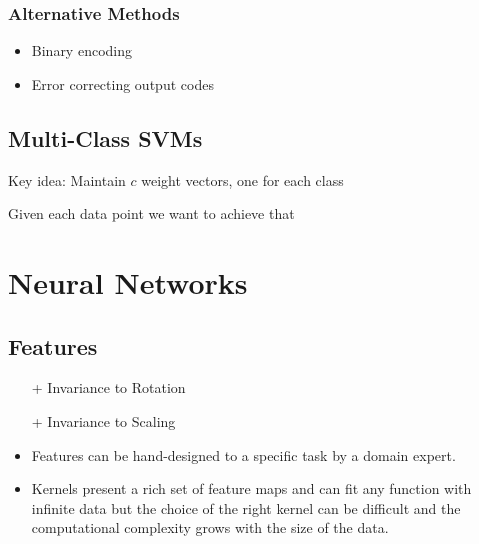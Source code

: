 \documentclass[8pt,a4paper]{scrartcl}
\begin{document}
\begin{multicols*}{3}
\subsubsection{Alternative Methods}

\begin{itemize}
\ncompaq
\item Binary encoding
\item Error correcting output codes
\end{itemize}

\subsection{Multi-Class SVMs}

Key idea: Maintain $c$ weight vectors, one for each class


Given each data point we want to achieve that




\section{Neural Networks}

\subsection{Features}

\begin{itemize}
\ncompaq
\item[+] Invariance to Rotation
\item[+] Invariance to Scaling
\item Features can be hand-designed to a specific task by a domain expert.
\item Kernels present a rich set of feature maps and can fit any function with infinite data but the choice of the right kernel can be difficult and the computational complexity grows with the size of the data.
\end{itemize}


\end{multicols*}
\end{document}
